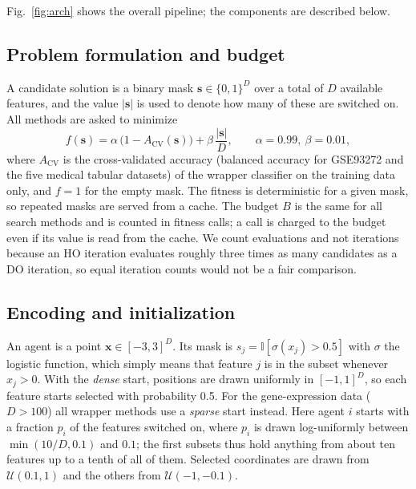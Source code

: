 \documentclass[pdflatex,sn-basic]{sn-jnl}
\begin{document}
Fig.~\ref{fig:arch} shows the overall pipeline; the components are described below.

\subsection{Problem formulation and budget}
A candidate solution is a binary mask $\mathbf{s}\in\{0,1\}^D$ over a total of $D$ available features, and the value $|\mathbf{s}|$ is used to denote how many of these are switched on. All methods are asked to minimize
\begin{equation}
f(\mathbf{s}) = \alpha\,\bigl(1-A_{\mathrm{CV}}(\mathbf{s})\bigr) + \beta\,\frac{|\mathbf{s}|}{D}, \qquad \alpha=0.99,\ \beta=0.01,
\label{eq:fitness}
\end{equation}
where $A_{\mathrm{CV}}$ is the cross-validated accuracy (balanced accuracy for GSE93272 and the five medical tabular datasets) of the wrapper classifier on the training data only, and $f=1$ for the empty mask. The fitness is deterministic for a given mask, so repeated masks are served from a cache. The budget $B$ is the same for all search methods and is counted in fitness calls; a call is charged to the budget even if its value is read from the cache. We count evaluations and not iterations because an HO iteration evaluates roughly three times as many candidates as a DO iteration, so equal iteration counts would not be a fair comparison.

\subsection{Encoding and initialization}
An agent is a point $\mathbf{x}\in[-3,3]^D$. Its mask is $s_j=\mathbb{I}[\sigma(x_j)>0.5]$ with $\sigma$ the logistic function, which simply means that feature $j$ is in the subset whenever $x_j>0$. With the \emph{dense} start, positions are drawn uniformly in $[-1,1]^D$, so each feature starts selected with probability 0.5. For the gene-expression data ($D>100$) all wrapper methods use a \emph{sparse} start instead. Here agent $i$ starts with a fraction $p_i$ of the features switched on, where $p_i$ is drawn log-uniformly between $\min(10/D,0.1)$ and $0.1$; the first subsets thus hold anything from about ten features up to a tenth of all of them. Selected coordinates are drawn from $\mathcal{U}(0.1,1)$ and the others from $\mathcal{U}(-1,-0.1)$.
\end{document}
